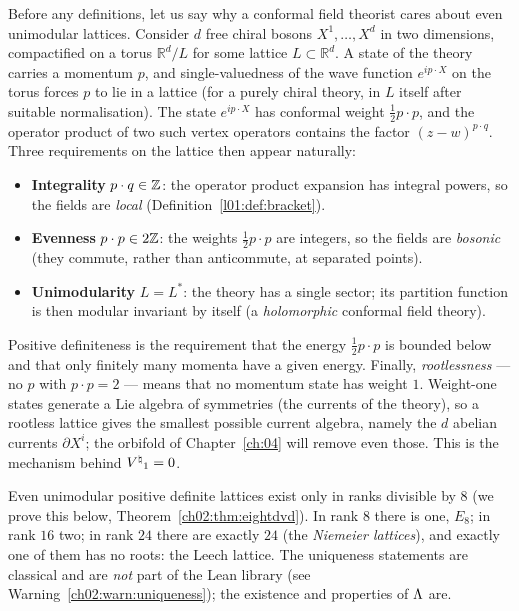 Before any definitions, let us say why a conformal field theorist cares about even unimodular
lattices.  Consider $d$ free chiral bosons $X^1,\dots,X^d$ in two dimensions, compactified on a
torus $\mathbb{R}^d/L$ for some lattice $L\subset\mathbb{R}^d$.  A state of the theory carries a
momentum $p$, and single-valuedness of the wave function $e^{i p\cdot X}$ on the torus forces $p$
to lie in a lattice (for a purely chiral theory, in $L$ itself after suitable normalisation).  The
state $e^{ip\cdot X}$ has conformal weight $\tfrac12 p\cdot p$, and the operator product of two
such vertex operators contains the factor $(z-w)^{p\cdot q}$.  Three requirements on the lattice
then appear naturally:
\begin{itemize}
  \item \textbf{Integrality} $p\cdot q\in{\mathbb{Z}}$: the operator product expansion has integral powers,
        so the fields are \emph{local} (Definition~\ref{l01:def:bracket}).
  \item \textbf{Evenness} $p\cdot p\in2{\mathbb{Z}}$: the weights $\tfrac12 p\cdot p$ are integers, so the
        fields are \emph{bosonic} (they commute, rather than anticommute, at separated points).
  \item \textbf{Unimodularity} $L=L^*$: the theory has a single sector; its partition function
        is then modular invariant by itself (a \emph{holomorphic} conformal field theory).
\end{itemize}
Positive definiteness is the requirement that the energy $\tfrac12 p\cdot p$ is bounded below
and that only finitely many momenta have a given energy.  Finally, \emph{rootlessness} --- no $p$
with $p\cdot p=2$ --- means that no momentum state has weight $1$.  Weight-one states generate a
Lie algebra of symmetries (the currents of the theory), so a rootless lattice gives the smallest
possible current algebra, namely the $d$ abelian currents $\partial X^i$; the orbifold of
Chapter~\ref{ch:04} will remove even those.  This is the mechanism behind ${V^{\natural}}_1=0$.

Even unimodular positive definite lattices exist only in ranks divisible by $8$ (we prove this
below, Theorem~\ref{ch02:thm:eightdvd}).  In rank $8$ there is one, $E_8$; in rank $16$ two; in
rank $24$ there are exactly $24$ (the \emph{Niemeier lattices}), and exactly one of them has no
roots: the Leech lattice.  The uniqueness statements are classical and are \emph{not} part of the
Lean library (see Warning~\ref{ch02:warn:uniqueness}); the existence and properties of ${\Lambda}$
are.

